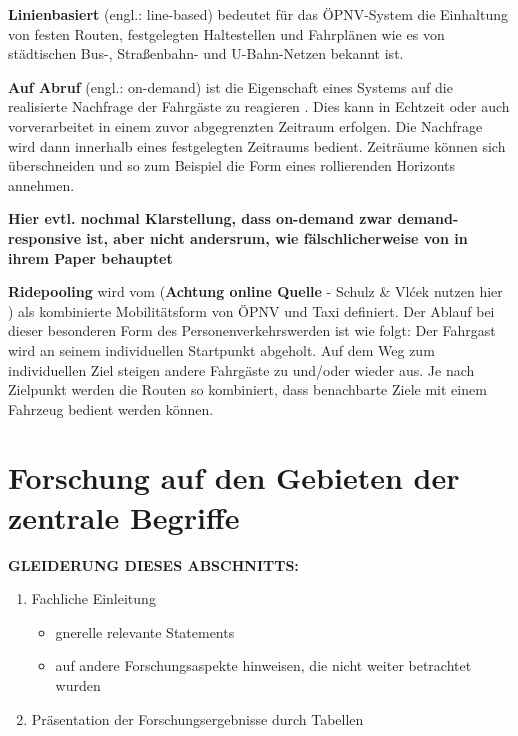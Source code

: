 \textbf{Linienbasiert} (engl.: line-based) bedeutet für das ÖPNV-System die Einhaltung von festen Routen, festgelegten Haltestellen und Fahrplänen wie es von städtischen Bus-, Straßenbahn- und U-Bahn-Netzen bekannt ist.

\textbf{Auf Abruf} (engl.: on-demand) ist die Eigenschaft eines Systems auf die realisierte Nachfrage der Fahrgäste zu reagieren \parencite[vgl.][S.3]{vansteenwegen_survey_2022}. Dies kann in Echtzeit oder auch vorverarbeitet in einem zuvor abgegrenzten Zeitraum erfolgen. Die Nachfrage wird dann innerhalb eines festgelegten Zeitraums bedient. Zeiträume können sich überschneiden und so zum Beispiel die Form eines rollierenden Horizonts annehmen.

\textbf{Hier evtl. nochmal Klarstellung, dass on-demand zwar demand-responsive ist, aber nicht andersrum, wie fälschlicherweise von \textcite{wang_multilevel_2014} in ihrem Paper behauptet}

\textbf{Ridepooling} wird vom \textcite{verband_der_automobilindustrie_ridepooling_2025} (\textbf{Achtung online Quelle} - Schulz \& Vlćek nutzen hier \parencite{vansteenwegen_survey_2022}) als kombinierte Mobilitätsform von ÖPNV und Taxi definiert. Der Ablauf bei dieser besonderen Form des Personenverkehrswerden ist wie folgt: Der Fahrgast wird an seinem individuellen Startpunkt abgeholt. Auf dem Weg zum individuellen Ziel steigen andere Fahrgäste zu und/oder wieder aus. Je nach Zielpunkt werden die Routen so kombiniert, dass benachbarte Ziele mit einem Fahrzeug bedient werden können.   
\section{Forschung auf den Gebieten der zentrale Begriffe}
\label{sec:2.1}
\label{sec:Kontext}

\textbf{GLEIDERUNG DIESES ABSCHNITTS:}
\begin{enumerate}
    \item Fachliche Einleitung
    \begin{itemize}
        \item gnerelle relevante Statements
        \item auf andere Forschungsaspekte hinweisen, die nicht weiter betrachtet wurden
    \end{itemize}
    \item Präsentation der Forschungsergebnisse durch Tabellen
\end{enumerate}

